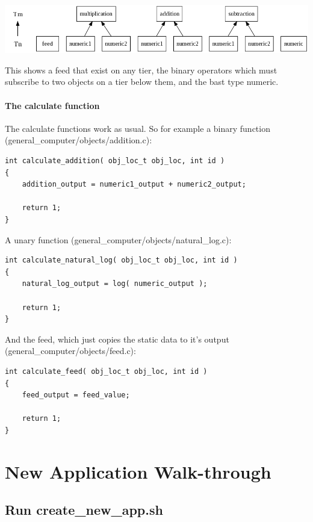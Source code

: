 \documentclass{report}
\begin{document}
\includegraphics[scale=0.4]{generalcomputerabstractsimple.png}

This shows a feed that exist on any tier, the binary operators which must subscribe to two objects on a tier below them, and the bast type numeric.

\subsubsection{The calculate function}

The calculate functions work as usual. So for example a binary function (general_computer/objects/addition.c):

\begin{verbatim}
int calculate_addition( obj_loc_t obj_loc, int id )
{
    addition_output = numeric1_output + numeric2_output;

    return 1;
}
\end{verbatim}

A unary function (general_computer/objects/natural_log.c):

\begin{verbatim}
int calculate_natural_log( obj_loc_t obj_loc, int id )
{
    natural_log_output = log( numeric_output );

    return 1;
}
\end{verbatim}

And the feed, which just copies the static data to it's output (general_computer/objects/feed.c):

\begin{verbatim}
int calculate_feed( obj_loc_t obj_loc, int id )
{
    feed_output = feed_value;

    return 1;
}
\end{verbatim}









\chapter{New Application Walk-through}

\section{Run create_new_app.sh}
\end{document}
